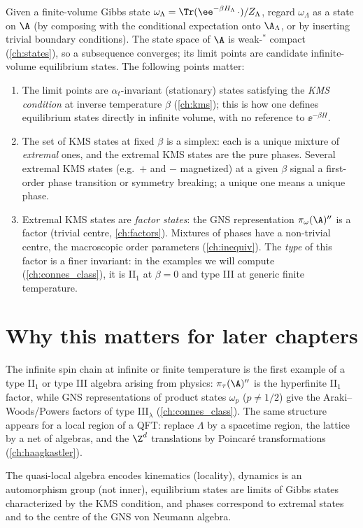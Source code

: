 Given a finite-volume Gibbs state $\omega_\Lambda=\Tr(\ee^{-\beta H_\Lambda}\,\cdot)/Z_\Lambda$, regard $\omega_\Lambda$ as a state on $\A$ (by composing with the conditional expectation onto $\A_\Lambda$, or by inserting trivial boundary conditions). The state space of $\A$ is weak-$^*$ compact (\cref{ch:states}), so a subsequence converges; its limit points are candidate infinite-volume equilibrium states. The following points matter:
\begin{enumerate}
\item The limit points are $\alpha_t$-invariant (stationary) states satisfying the \emph{KMS condition} at inverse temperature $\beta$ (\cref{ch:kms}); this is how one defines equilibrium states directly in infinite volume, with no reference to $\ee^{-\beta H}$.
\item The set of KMS states at fixed $\beta$ is a simplex: each is a unique mixture of \emph{extremal} ones, and the extremal KMS states are the pure phases. Several extremal KMS states (e.g.\ $+$ and $-$ magnetized) at a given $\beta$ signal a first-order phase transition or symmetry breaking; a unique one means a unique phase.
\item Extremal KMS states are \emph{factor states}: the GNS representation $\pi_\omega(\A)''$ is a factor (trivial centre, \cref{ch:factors}). Mixtures of phases have a non-trivial centre, the macroscopic order parameters (\cref{ch:inequiv}). The \emph{type} of this factor is a finer invariant: in the examples we will compute (\cref{ch:connes_class}), it is II$_1$ at $\beta=0$ and type III at generic finite temperature.
\end{enumerate}

\section{Why this matters for later chapters}

The infinite spin chain at infinite or finite temperature is the first example of a type II$_1$ or type III algebra arising from physics: $\pi_\tau(\A)''$ is the hyperfinite II$_1$ factor, while GNS representations of product states $\omega_p$ ($p\neq1/2$) give the Araki--Woods/Powers factors of type III$_\lambda$ (\cref{ch:connes_class}). The same structure appears for a local region of a QFT: replace $\Lambda$ by a spacetime region, the lattice by a net of algebras, and the $\Z^d$ translations by Poincar\'e transformations (\cref{ch:haagkastler}).

\begin{keyidea}
The quasi-local algebra encodes kinematics (locality), dynamics is an automorphism group (not inner), equilibrium states are limits of Gibbs states characterized by the KMS condition, and phases correspond to extremal states and to the centre of the GNS von Neumann algebra.
\end{keyidea}

